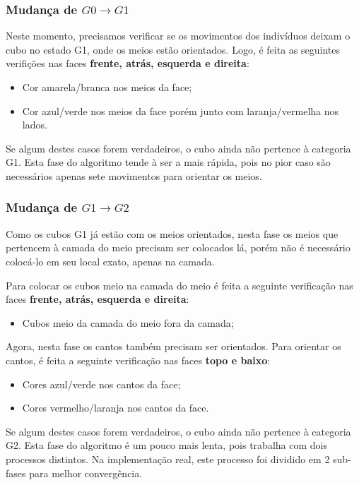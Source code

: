 \documentclass[12pt]{article}
\begin{document}
    \subsubsection{Mudança de $G0 \to G1$}
      Neste momento, precisamos verificar se os movimentos dos indivíduos deixam o cubo no estado G1, onde os meios estão orientados. Logo, é feita as seguintes verifições nas faces \textbf{frente, atrás, esquerda e direita}:

      \begin{itemize}
         \item Cor amarela/branca nos meios da face;
         \item Cor azul/verde nos meios da face porém junto com laranja/vermelha nos lados.
       \end{itemize}

      Se algum destes casos forem verdadeiros, o cubo ainda não pertence à categoria G1. Esta fase do algoritmo tende à ser a mais rápida, pois no pior caso são necessários apenas sete movimentos para orientar os meios.

    \subsubsection{Mudança de $G1 \to G2$}
      Como os cubos G1 já estão com os meios orientados, nesta fase os meios que pertencem à camada do meio precisam ser colocados lá, porém não é necessário colocá-lo em seu local exato, apenas na camada.

      Para colocar os cubos meio na camada do meio é feita a seguinte verificação nas faces \textbf{frente, atrás, esquerda e direita}:
      \begin{itemize}
        \item Cubos meio da camada do meio fora da camada;
      \end{itemize}

      Agora, nesta fase os cantos também precisam ser orientados. Para orientar os cantos, é feita a seguinte verificação nas faces \textbf{topo e baixo}:

      \begin{itemize}
        \item Cores azul/verde nos cantos da face;
        \item Cores vermelho/laranja nos cantos da face.
      \end{itemize}

      Se algum destes casos forem verdadeiros, o cubo ainda não pertence à categoria G2. Esta fase do algoritmo é um pouco mais lenta, pois trabalha com dois processos distintos. Na implementação real, este processo foi dividido em 2 sub-fases para melhor convergência.
\end{document}
